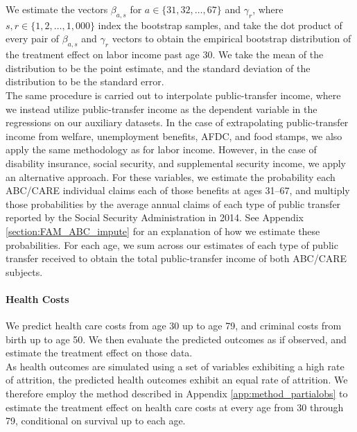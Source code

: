 \noindent We estimate the vectors $\beta_{a, s}$ for $a \in \{31, 32, \dots, 67\}$ and $\gamma_r$, where
$s,r \in \{1,2,\dots,1,000\}$ index the bootstrap samples, and take the dot product of every pair of
$\beta_{a,s}$ and $\gamma_r$ vectors to obtain the empirical bootstrap distribution of the treatment
effect on labor income past age 30. We take the mean of the distribution to be the point estimate,
and the standard deviation of the distribution to be the standard error. \\


\noindent The same procedure is carried out to interpolate public-transfer income, where we instead utilize public-transfer
income as the dependent variable in the regressions on our auxiliary datasets. In the case of
extrapolating public-transfer income from welfare, unemployment benefits, AFDC, and food stamps, we also apply
the same methodology as for labor income. However, in the case of disability insurance, social
security, and supplemental security income, we apply an alternative approach. For these variables, we estimate
the probability each ABC/CARE individual claims each of those benefits at ages 31--67, and multiply those
probabilities by the average annual claims of each type of public transfer reported by the Social
Security Administration in 2014. See Appendix \ref{section:FAM_ABC_impute}
for an explanation of how we estimate these probabilities. For each age, we sum across our estimates of
each type of public transfer received to obtain the total public-transfer income of both ABC/CARE subjects. \\


\paragraph{Health Costs}

\noindent We predict health care costs from age 30 up to age 79, and criminal costs from birth
up to age 50. We then evaluate the predicted outcomes as if observed, and estimate the
treatment effect on those data.\\

\noindent As health outcomes are simulated using a set of variables exhibiting a high rate of attrition, the
predicted health outcomes exhibit an equal rate of attrition. We therefore employ the method described
in Appendix \ref{app:method_partialobs} to estimate the treatment effect on health care costs at
every age from 30 through 79, conditional on survival up to each age. \\

